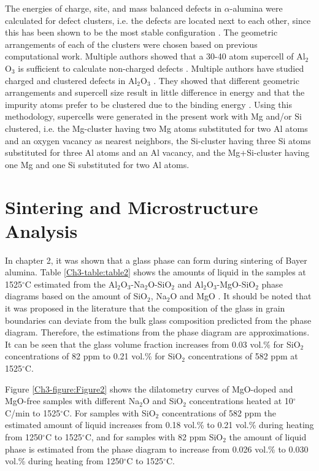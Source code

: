 The energies of charge, site, and mass balanced defects in $\alpha$-alumina were calculated for defect clusters, i.e. the defects are located next to each other, since this has been shown to be the most stable configuration \cite{Atkinson2003}. The geometric arrangements of each of the clusters were chosen based on previous computational work. Multiple authors showed that a 30-40 atom supercell of Al$_{2}$O$_{3}$ is sufficient to calculate non-charged defects \cite{Atkinson2003,Grimes1994,Lagerlof1998,Xiang2015,Sarsam2013}. Multiple authors have studied charged and clustered defects in Al$_{2}$O$_{3}$ \cite{Atkinson2003,Grimes1994,Lagerlof1998,Xiang2015,Sarsam2013}. They showed that different geometric arrangements and supercell size result in little difference in energy and that the impurity atoms prefer to be clustered due to the binding energy \cite{Atkinson2003,Grimes1994,Lagerlof1998,Xiang2015,Sarsam2013}. Using this methodology, supercells were generated in the present work with Mg and/or Si clustered, i.e. the Mg-cluster having two Mg atoms substituted for two Al atoms and an oxygen vacancy as nearest neighbors, the Si-cluster having three Si atoms substituted for three Al atoms and an Al vacancy, and the Mg+Si-cluster having one Mg and one Si substituted for two Al atoms. 

\section{Sintering and Microstructure Analysis}

In chapter 2, it was shown that a glass phase can form during sintering of Bayer alumina. Table \ref{Ch3-table:table2} shows the amounts of liquid in the samples at 1525$^{\circ}$C estimated from the Al$_{2}$O$_{3}$-Na$_{2}$O-SiO$_{2}$ and Al$_{2}$O$_{3}$-MgO-SiO$_{2}$ phase diagrams based on the amount of SiO$_{2}$, Na$_{2}$O and MgO \cite{Mao2005}. It should be noted that it was proposed in the literature \cite{Subramaniam2006} that the composition of the glass in grain boundaries can deviate from the bulk glass composition predicted from the phase diagram. Therefore, the estimations from the phase diagram are approximations. It can be seen that the glass volume fraction increases from 0.03 vol.\% for SiO$_{2}$ concentrations of 82 ppm to 0.21 vol.\% for SiO$_{2}$ concentrations of 582 ppm at 1525$^{\circ}$C. 

Figure \ref{Ch3-figure:Figure2} shows the dilatometry curves of MgO-doped and MgO-free samples with different Na$_{2}$O and SiO$_{2}$ concentrations heated at 10$^{\circ}$C/min to 1525$^{\circ}$C. For samples with SiO$_{2}$ concentrations of 582 ppm the estimated amount of liquid increases from 0.18 vol.\% to 0.21 vol.\% during heating from 1250$^{\circ}$C to 1525$^{\circ}$C, and for samples with 82 ppm SiO$_{2}$ the amount of liquid phase is estimated from the phase diagram to increase from 0.026 vol.\% to 0.030 vol.\% during heating from 1250$^{\circ}$C to 1525$^{\circ}$C. 

